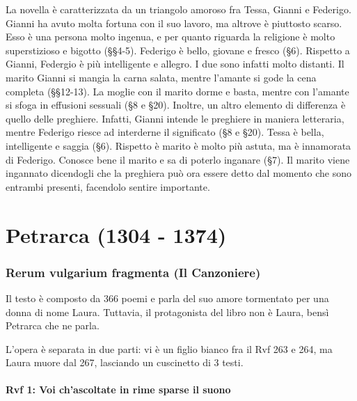 \documentclass[a4paper]{article}
\begin{document}
La novella è caratterizzata da un triangolo amoroso fra Tessa, Gianni e Federigo.
Gianni ha avuto molta fortuna con il suo lavoro, ma altrove è piuttosto scarso.
Esso è una persona molto ingenua, e per quanto riguarda la religione è molto
superstizioso e bigotto (§§4-5).
Federigo è bello, giovane e fresco (§6).
Rispetto a Gianni, Federgio è più intelligente e allegro.
I due sono infatti molto distanti.
Il marito Gianni si mangia la carna salata, mentre l'amante si gode la cena completa (§§12-13).
La moglie con il marito dorme e basta, mentre con l'amante si sfoga in effusioni sessuali (§8 e §20).
Inoltre, un altro elemento di differenza è quello delle preghiere. Infatti, Gianni intende le preghiere in maniera letteraria,
mentre Federigo riesce ad interderne il significato (§8 e §20).
%
Tessa è bella, intelligente e saggia (§6). Rispetto è marito è molto più astuta, ma è innamorata di Federigo.
Conosce bene il marito e sa di poterlo inganare (§7).
Il marito viene ingannato dicendogli che la preghiera può ora essere detto dal momento che sono
entrambi presenti, facendolo sentire importante.



\pagebreak

\part{Petrarca (1304 - 1374)}



\section{Rerum vulgarium fragmenta (Il Canzoniere)}

Il testo è composto da 366 poemi e parla del suo amore tormentato per una donna di nome Laura.
Tuttavia, il protagonista del libro non è Laura, bensì Petrarca che ne parla.

L'opera è separata in due parti: vi è un figlio bianco fra il Rvf 263 e 264,
ma Laura muore dal 267, lasciando un cuscinetto di 3 testi.

\subsection{Rvf 1: Voi ch'ascoltate in rime sparse il suono}
\end{document}
